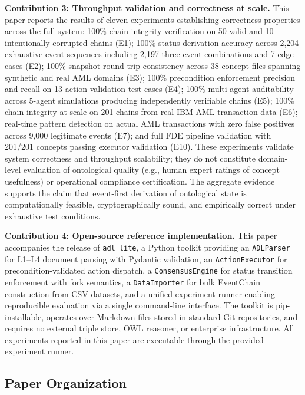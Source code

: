 \textbf{Contribution 3: Throughput validation and correctness at scale.} This paper reports the results of eleven experiments establishing correctness properties across the full system: 100\% chain integrity verification on 50 valid and 10 intentionally corrupted chains (E1); 100\% status derivation accuracy across 2,204 exhaustive event sequences including 2,197 three-event combinations and 7 edge cases (E2); 100\% snapshot round-trip consistency across 38 concept files spanning synthetic and real AML domains (E3); 100\% precondition enforcement precision and recall on 13 action-validation test cases (E4); 100\% multi-agent auditability across 5-agent simulations producing independently verifiable chains (E5); 100\% chain integrity at scale on 201 chains from real IBM AML transaction data (E6); real-time pattern detection on actual AML transactions with zero false positives across 9,000 legitimate events (E7); and full FDE pipeline validation with 201/201 concepts passing executor validation (E10). These experiments validate system correctness and throughput scalability; they do not constitute domain-level evaluation of ontological quality (e.g., human expert ratings of concept usefulness) or operational compliance certification. The aggregate evidence supports the claim that event-first derivation of ontological state is computationally feasible, cryptographically sound, and empirically correct under exhaustive test conditions.

\textbf{Contribution 4: Open-source reference implementation.} This paper accompanies the release of \texttt{adl\_lite}, a Python toolkit providing an \texttt{ADLParser} for L1--L4 document parsing with Pydantic validation, an \texttt{ActionExecutor} for precondition-validated action dispatch, a \texttt{ConsensusEngine} for status transition enforcement with fork semantics, a \texttt{DataImporter} for bulk EventChain construction from CSV datasets, and a unified experiment runner enabling reproducible evaluation via a single command-line interface. The toolkit is pip-installable, operates over Markdown files stored in standard Git repositories, and requires no external triple store, OWL reasoner, or enterprise infrastructure. All experiments reported in this paper are executable through the provided experiment runner.

\subsection{Paper Organization}\label{paper-organization}

